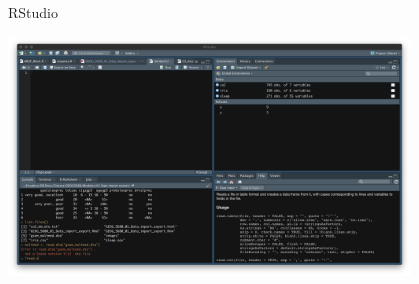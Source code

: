 \documentclass[aspectratio=169]{beamer}\usepackage[]{graphicx}\usepackage[]{color}
\begin{document}
\begin{frame}{RStudio}
  	\begin{center}
			\includegraphics[width=0.8\textwidth]{./images/rstudio_script.png}
		\end{center}
\end{frame}
% 

\end{document}
